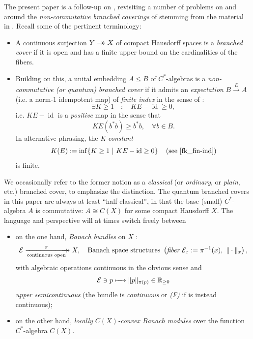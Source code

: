 \documentclass[11pt,leqno]{article}
\theoremstyle{plain}
\theoremstyle{plain}
\theoremstyle{plain}
\numberwithin{equation}{section}
\theoremstyle{nonumberplain}
\newcommand\bR{{\mathbb R}}
\newcommand\cE{{\mathcal E}}
\newcommand\1{{\bf 1}}
\DeclareMathOperator{\id}{id}
\newcommand{\xrightarrowdbl}[2][]{%
  \xrightarrow[#1]{#2}\mathrel{\mkern-14mu}\rightarrow
}
\begin{document}
The present paper is a follow-up on \cite{2409.03531v1}, revisiting a number of problems on and around the {\it non-commutative branched coverings} of \cite[Definition 1.2]{pt_brnch} stemming from the material in \cite{bg_cx-exp}. Recall some of the pertinent terminology:
\begin{itemize}[wide]
\item A continuous surjection $Y\xrightarrowdbl{}X$ of compact Hausdorff spaces is a {\it branched cover} if it is open and has a finite upper bound on the cardinalities of the fibers. 

\item Building on this, a unital embedding $A\le B$ of $C^*$-algebras is a {\it non-commutative (or quantum) branched cover} if it admits an {\it expectation} $B\xrightarrow{E}A$ (i.e. \cite[Theorem II.6.10.2]{blk} a norm-1 idempotent map) of {\it finite index} in the sense of \cite[Definition 2]{fk_fin-ind}:
  \begin{equation*}
    \exists K\ge 1
    \quad:\quad
    KE-\id\ge 0,
  \end{equation*}
  i.e. $KE-\id$ is a {\it positive} map in the sense \cite[Definition II.6.9.1]{blk} that
  \begin{equation*}
    KE(b^*b)\ge b^*b,\quad\forall b\in B.
  \end{equation*}
  In alternative phrasing, the {\it K-constant}
  \begin{equation}\label{eq:k.const}
    K(E):=\inf\{K\ge 1\ |\ KE-\id\ge 0\}
    \quad
    \left(\text{see \cite[p.89]{fk_fin-ind}}\right)
  \end{equation}
  is finite. 
\end{itemize}
We occasionally refer to the former notion as a {\it classical} (or {\it ordinary}, or {\it plain}, etc.) branched cover, to emphasize the distinction. The quantum branched covers in this paper are always at least ``half-classical'', in that the base (small) $C^*$-algebra $A$ is commutative: $A\cong C(X)$ for some compact Hausdorff $X$. The language and perspective will at times switch freely between
\begin{itemize}[wide]
\item on the one hand, {\it Banach bundles} on $X$ \cite[Definition 1.1]{dg_ban-bdl}:
  \begin{equation*}
    \cE\xrightarrowdbl[\text{continuous open}]{\quad\pi\quad}X
    ,\quad
    \text{Banach space structures }
    \left(
      \text{{\it fiber} }\cE_x:=\pi^{-1}(x),\ \|\cdot\|_x
    \right),
  \end{equation*}
  with algebraic operations continuous in the obvious sense and
  \begin{equation}\label{eq:normfunc}
    \cE\ni p
    \xmapsto{\quad}
    \|p\|_{\pi(p)}
    \in \bR_{\ge 0}
  \end{equation}
  {\it upper semicontinuous} \cite[Chapter 3, Problem F]{kel-top} (the bundle is {\it continuous} or {\it (F)} if  is instead continuous);

\item on the other hand, {\it locally $C(X)$-convex Banach modules} \cite[\S 6.1]{hk_shv-bdl} over the function $C^*$-algebra $C(X)$. 
\end{itemize}
\end{document}
